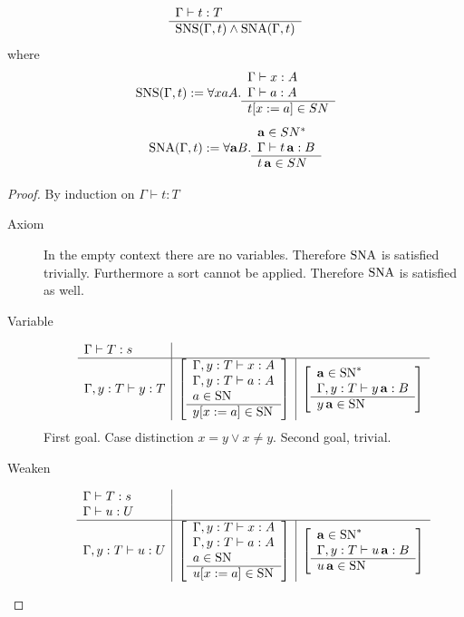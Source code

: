 \documentclass[12pt]{article}
\begin{document}
\begin{theorem}
  $$
  \begin{array}{l} \Gamma \vdash t : T \\ \hline \text{SNS}(\Gamma, t) \land \text{SNA}(\Gamma,t)\end{array}
  $$
  where
  $$
  \text{SNS}(\Gamma,t) :=
  \forall x a A.
  \begin{array}{l} \Gamma \vdash x : A \\
    \Gamma \vdash a: A
   \\ \hline  t[x:=a] \in SN\end{array}
  $$
  $$
  \text{SNA}(\Gamma,t) :=
  \forall \mathbf{a} B.
  \begin{array}{l} \mathbf{a} \in SN^* \\
  \Gamma \vdash t \, \mathbf{a} : B  \\ \hline t \, \mathbf{a} \in SN\end{array}
  $$

  \begin{proof} By induction on $\Gamma \vdash t : T$
    \begin{description}
    \item[Axiom]
      In the empty context there are no variables. Therefore $\text{SNA}$ is
      satisfied trivially. Furthermore a sort cannot be applied. Therefore
      $\text{SNA}$ is satisfied as well.

    \item[Variable]
      $$
      \begin{array}{l | l | l}
        \Gamma \vdash T:s \\
        \hline
        \Gamma,y:T \vdash y:T
        & \left[
          \begin{array}{l} \Gamma,y:T \vdash x : A \\
        \Gamma,y:T \vdash a: A  \\
        a \in \text{SN}
         \\ \hline y[x:=a] \in \text{SN}\end{array}\right]
        & \left[
          \begin{array}{l} \mathbf{a} \in \text{SN}^* \\
        \Gamma,y:T \vdash y \, \mathbf{a} : B \\ \hline y \, \mathbf{a} \in \text{SN}\end{array}
        \right]
      \end{array}
      $$
      First goal. Case distinction $x=y \lor x\ne y$. Second goal, trivial.

    \item[Weaken]
      $$
      \begin{array}{l | l | l}
        \Gamma \vdash T:s \\
        \Gamma \vdash u:U \\
        \hline
        \Gamma,y:T \vdash u:U
        & \left[
          \begin{array}{l} \Gamma,y:T \vdash x : A \\
        \Gamma,y:T \vdash a: A  \\
        a \in \text{SN}
         \\ \hline u[x:=a] \in \text{SN}\end{array}\right]
        & \left[
          \begin{array}{l} \mathbf{a} \in \text{SN}^* \\
        \Gamma,y:T \vdash u \, \mathbf{a} : B \\ \hline u \, \mathbf{a} \in \text{SN}\end{array}
        \right]
      \end{array}
      $$


\end{description}
\end{proof}
\end{theorem}
\end{document}
